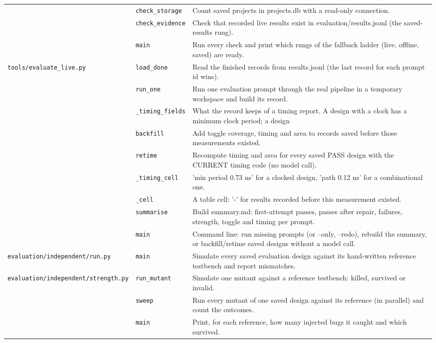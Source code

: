 \begin{longtable}{@{}p{2.8cm}>{\raggedright\arraybackslash}p{4.6cm}p{7.9cm}@{}}
{\small } & \texttt{\small check\_\allowbreak{}storage} & Count saved projects in projects.db with a read-only connection. \\
{\small } & \texttt{\small check\_\allowbreak{}evidence} & Check that recorded live results exist in evaluation/results.jsonl (the saved-results rung). \\
{\small } & \texttt{\small main} & Run every check and print which rungs of the fallback ladder (live, offline, saved) are ready. \\
{\small \nolinkurl{tools/evaluate_live.py}} & \texttt{\small load\_\allowbreak{}done} & Read the finished records from results.jsonl (the last record for each prompt id wins). \\
{\small } & \texttt{\small run\_\allowbreak{}one} & Run one evaluation prompt through the real pipeline in a temporary workspace and build its record. \\
{\small } & \texttt{\small \_\allowbreak{}timing\_\allowbreak{}fields} & What the record keeps of a timing report. A design with a clock has a minimum clock period; a design \\
{\small } & \texttt{\small backfill} & Add toggle coverage, timing and area to records saved before those measurements existed. \\
{\small } & \texttt{\small retime} & Recompute timing and area for every saved PASS design with the CURRENT timing code (no model call). \\
{\small } & \texttt{\small \_\allowbreak{}timing\_\allowbreak{}cell} & 'min period 0.73 ns' for a clocked design, 'path 0.12 ns' for a combinational one. \\
{\small } & \texttt{\small \_\allowbreak{}cell} & A table cell: '-' for results recorded before this measurement existed. \\
{\small } & \texttt{\small summarise} & Build summary.md: first-attempt passes, passes after repair, failures, strength, toggle and timing per prompt. \\
{\small } & \texttt{\small main} & Command line: run missing prompts (or --only, --redo), rebuild the summary, or backfill/retime saved designs without a model call. \\
{\small \nolinkurl{evaluation/independent/run.py}} & \texttt{\small main} & Simulate every saved evaluation design against its hand-written reference testbench and report mismatches. \\
{\small \nolinkurl{evaluation/independent/strength.py}} & \texttt{\small run\_\allowbreak{}mutant} & Simulate one mutant against a reference testbench: killed, survived or invalid. \\
{\small } & \texttt{\small sweep} & Run every mutant of one saved design against its reference (in parallel) and count the outcomes. \\
{\small } & \texttt{\small main} & Print, for each reference, how many injected bugs it caught and which survived. \\
\end{longtable}
